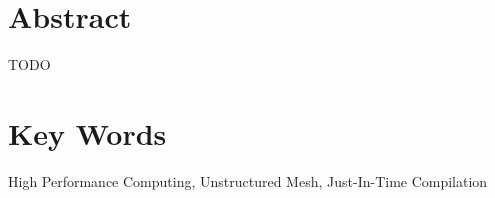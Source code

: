 
%
\vspace*{\fill}
\begin{adjustwidth}{60pt}{60pt}
\begin{center}
\section*{Abstract}
\normalsize
TODO\\
\lipsum[1]
\section*{Key Words}
High Performance Computing, Unstructured Mesh, Just-In-Time Compilation
\end{center}
\end{adjustwidth}
\vspace*{\fill}
